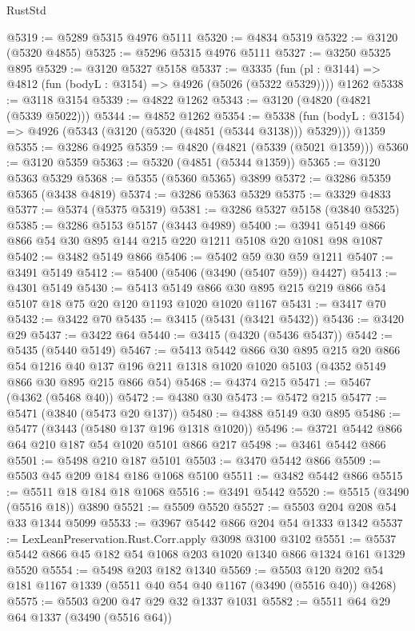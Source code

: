\begin{lexlean}{RustStd}
\begin{coremodule}
{\begin{coremodule}
{{{{{{{{{{{{{{{{{{{{{{{{{{@5319 := @5289 @5315 @4976 @5111
@5320 := @4834 @5319
@5322 := @3120 (@5320 @4855)
@5325 := @5296 @5315 @4976 @5111
@5327 := @3250 @5325 @895
@5329 := @3120 @5327 @5158
@5337 := @3335
    (fun (pl : @3144) => @4812 (fun (bodyL : @3154) => @4926 (@5026 (@5322 @5329))))
    @1262
@5338 := @3118 @3154
@5339 := @4822 @1262
@5343 := @3120 (@4820 (@4821 (@5339 @5022)))
@5344 := @4852 @1262
@5354 := @5338
    (fun (bodyL : @3154) => @4926 (@5343 (@3120 (@5320 (@4851 (@5344 @3138))) @5329)))
    @1359
@5355 := @3286 @4925
@5359 := @4820 (@4821 (@5339 (@5021 @1359)))
@5360 := @3120 @5359
@5363 := @5320 (@4851 (@5344 @1359))
@5365 := @3120 @5363 @5329
@5368 := @5355 (@5360 @5365) @3899
@5372 := @3286 @5359 @5365 (@3438 @4819)
@5374 := @3286 @5363 @5329
@5375 := @3329 @4833
@5377 := @5374 (@5375 @5319)
@5381 := @3286 @5327 @5158 (@3840 @5325)
@5385 := @3286 @5153 @5157 (@3443 @4989)
@5400 := @3941 @5149 @866 @866 @54 @30 @895 @144 @215 @220 @1211 @5108 @20 @1081 @98 @1087
@5402 := @3482 @5149 @866
@5406 := @5402 @59 @30 @59 @1211
@5407 := @3491 @5149
@5412 := @5400 (@5406 (@3490 (@5407 @59)) @4427)
@5413 := @4301 @5149
@5430 := @5413 @5149 @866 @30 @895 @215 @219 @866 @54 @5107 @18 @75 @20 @120 @1193 @1020 @1020 @1167
@5431 := @3417 @70
@5432 := @3422 @70
@5435 := @3415 (@5431 (@3421 @5432))
@5436 := @3420 @29
@5437 := @3422 @64
@5440 := @3415 (@4320 (@5436 @5437))
@5442 := @5435 (@5440 @5149)
@5467 := @5413
    @5442
    @866
    @30
    @895
    @215
    @20
    @866
    @54
    @1216
    @40
    @137
    @196
    @211
    @1318
    @1020
    @1020
    @5103
    (@4352 @5149 @866 @30 @895 @215 @866 @54)
@5468 := @4374 @215
@5471 := @5467 (@4362 (@5468 @40))
@5472 := @4380 @30
@5473 := @5472 @215
@5477 := @5471 (@3840 (@5473 @20 @137))
@5480 := @4388 @5149 @30 @895
@5486 := @5477 (@3443 (@5480 @137 @196 @1318 @1020))
@5496 := @3721 @5442 @866 @64 @210 @187 @54 @1020 @5101 @866 @217
@5498 := @3461 @5442 @866
@5501 := @5498 @210 @187 @5101
@5503 := @3470 @5442 @866
@5509 := @5503 @45 @209 @184 @186 @1068 @5100
@5511 := @3482 @5442 @866
@5515 := @5511 @18 @184 @18 @1068
@5516 := @3491 @5442
@5520 := @5515 (@3490 (@5516 @18)) @3890
@5521 := @5509 @5520
@5527 := @5503 @204 @208 @54 @33 @1344 @5099
@5533 := @3967 @5442 @866 @204 @54 @1333 @1342
@5537 := LexLeanPreservation.Rust.Corr.apply @3098 @3100 @3102
@5551 := @5537 @5442 @866 @45 @182 @54 @1068 @203 @1020 @1340 @866 @1324 @161 @1329 @5520
@5554 := @5498 @203 @182 @1340
@5569 := @5503 @120 @202 @54 @181 @1167 @1339 (@5511 @40 @54 @40 @1167 (@3490 (@5516 @40)) @4268)
@5575 := @5503 @200 @47 @29 @32 @1337 @1031
@5582 := @5511 @64 @29 @64 @1337 (@3490 (@5516 @64))
}}}}}}}}}}}}}}}}}}}}}}}}}}
\end{coremodule}}
\end{coremodule}
\end{lexlean}
